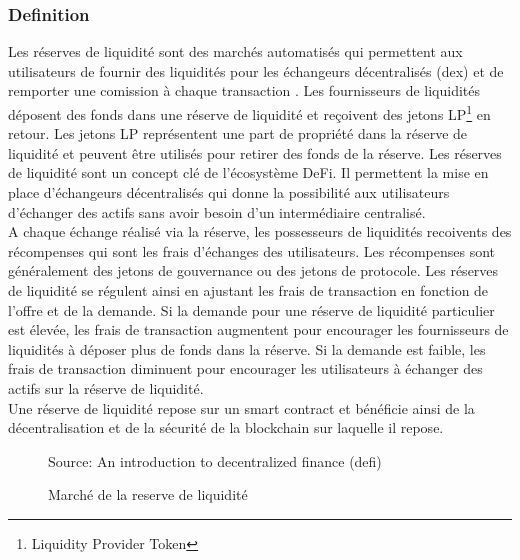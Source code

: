 
\subsubsection{Definition}
Les réserves de liquidité sont des marchés automatisés qui permettent aux utilisateurs de fournir des liquidités pour les échangeurs décentralisés (\acrshort{dex}) et de 
remporter une comission à chaque transaction \cite{jensen2021introduction, belchior2022survey, augustin2022yield}. 
Les fournisseurs de liquidités déposent des fonds dans une réserve de liquidité et reçoivent des jetons 
LP\footnote{Liquidity Provider Token} en retour. Les jetons LP représentent une part de propriété dans la réserve de liquidité et peuvent être utilisés pour 
retirer des fonds de la réserve. Les réserves de liquidité sont un concept clé de l’écosystème DeFi. Il permettent la mise en place d'échangeurs décentralisés 
qui donne la possibilité aux utilisateurs d’échanger des actifs sans avoir besoin d’un intermédiaire centralisé. \\
A chaque échange réalisé via la réserve, les possesseurs de liquidités recoivents des récompenses qui sont les frais d'échanges des utilisateurs. Les récompenses 
sont généralement des jetons de gouvernance ou des jetons de protocole. Les réserves de liquidité se régulent ainsi en ajustant les frais de transaction 
en fonction de l’offre et de la demande. Si la demande pour une réserve de liquidité particulier est élevée, les frais de transaction augmentent pour encourager 
les fournisseurs de liquidités à déposer plus de fonds dans la réserve. Si la demande est faible, les frais de transaction diminuent pour encourager les 
utilisateurs à échanger des actifs sur la réserve de liquidité. \\
Une réserve de liquidité repose sur un smart contract et bénéficie ainsi de la décentralisation et de la sécurité de la \gls{blockchain} sur laquelle il repose.
\begin{figure}[h!]
    \centering
    {\scriptsize Source: An introduction to decentralized finance (defi) \cite{jensen2021introduction} }
    \caption{Marché de la reserve de liquidité}
    \label{fig:liquidite}
\end{figure}

